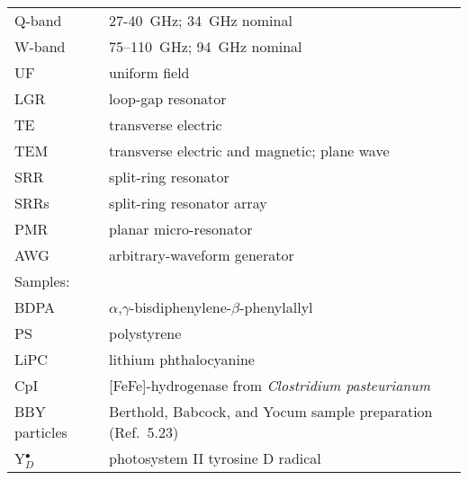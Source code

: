\documentclass[11pt,a4paper,openany,twoside,english,titlepage=true]{scrbook}
\newcounter{Seitenzahl}%
\begin{document}
\begin{table}[ht]
\begin{tabular}{ll}
Q-band          & 27-40~GHz; 34~GHz nominal \\ 
W-band          & 75–110~GHz; 94~GHz nominal \\  
UF              & uniform field \\ 
LGR             & loop-gap resonator \\ 
TE              & transverse electric \\
TEM             & transverse electric and magnetic; plane wave \\
SRR             & split-ring resonator \\
SRRs            & split-ring resonator array \\
PMR             & planar micro-resonator \\ 
AWG             & arbitrary-waveform generator \\ \hline \hline
\rowcolor{LightCyan}
Samples:        & \\ \hline
BDPA            & $\alpha$,$\gamma$-bisdiphenylene-$\beta$-phenylallyl \\
PS              & polystyrene \\
LiPC            & lithium phthalocyanine \\
CpI             & [FeFe]-hydrogenase from \textit{Clostridium pasteurianum} \\
BBY particles   & Berthold, Babcock, and Yocum sample preparation (Ref.~5.23) $\qquad$\\
Y$_D^\bullet$   & photosystem II tyrosine D radical \\ \hline \hline
\end{tabular}\newpage
{}
\end{table}
\newpage


\cleardoublepage
\setcounter{Seitenzahl}{\value{page}}
\setcounter{page}{0}
\mainmatter









\begin{appendices}




%
\end{appendices}
\end{document}
